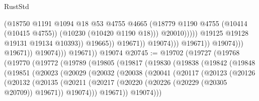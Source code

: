 \begin{lexlean}{RustStd}
\begin{coremodule}
                                                      (@18750
                                                        @1191
                                                        @1094
                                                        @18
                                                        @53
                                                        @4755
                                                        @4665
                                                        (@18779
                                                          @1190
                                                          @4755
                                                          (@10414 (@10415 @4755))
                                                          (@10230 (@10420 @1190 @18)))
                                                        @20010)))))
                                              @19125
                                              @19128
                                              @19131
                                              @19134
                                              @10393))
                                          @19665))
                                      @19671))
                                  @19074)))
                            @19671))
                        @19074)))
                  @19671))
              @19074)))
        @19671))
    @19074
@20745 := @19702
    (@19727
      (@19768
        (@19770
          (@19772
            (@19789
              (@19805
                (@19817
                  (@19830
                    (@19838
                      (@19842
                        (@19848
                          (@19851
                            (@20023
                              (@20029
                                (@20032
                                  (@20038
                                    (@20041
                                      (@20117
                                        (@20123
                                          (@20126
                                            (@20132
                                              (@20135
                                                (@20211
                                                  (@20217
                                                    (@20220
                                                      (@20226 (@20229 (@20305 @20709)) @19671))
                                                    @19074)))
                                              @19671))
                                          @19074)))

\end{coremodule}
\end{lexlean}
